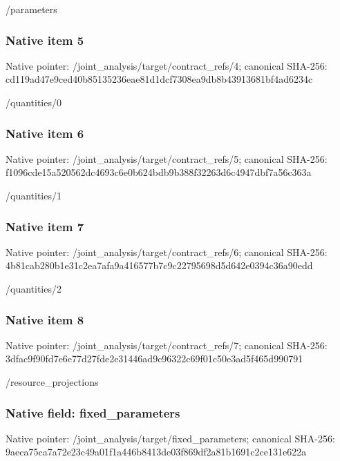 \documentclass[10pt,a4paper]{article}
\begin{document}
/parameters


\subsubsection{Native item 5}


Native pointer: /joint\_analysis/target/contract\_refs/4; canonical SHA-256: cd119ad47e9ced40b8513523\allowbreak{}6eae81d1dcf7308ea9db8b43\allowbreak{}913681bf4ad6234c


/quantities/0


\subsubsection{Native item 6}


Native pointer: /joint\_analysis/target/contract\_refs/5; canonical SHA-256: f1096cde15a520562dc4693c\allowbreak{}6e0b624bdb9b388f32263d6c\allowbreak{}4947dbf7a56c363a


/quantities/1


\subsubsection{Native item 7}


Native pointer: /joint\_analysis/target/contract\_refs/6; canonical SHA-256: 4b81cab280b1e31c2ea7afa9\allowbreak{}a416577b7c9c22795698d5d6\allowbreak{}42e0394c36a90edd


/quantities/2


\subsubsection{Native item 8}


Native pointer: /joint\_analysis/target/contract\_refs/7; canonical SHA-256: 3dfac9f90fd7e6e77d27fde2\allowbreak{}e31446ad9c96322c69f01c50\allowbreak{}e3ad5f465d990791


/resource\_projections


\subsubsection{Native field: fixed\_parameters}


Native pointer: /joint\_analysis/target/fixed\_parameters; canonical SHA-256: 9aeca75ca7a72e23c49a01f1\allowbreak{}a446b8413de03f869df2a81b\allowbreak{}1691c2ce131e622a
\end{document}
